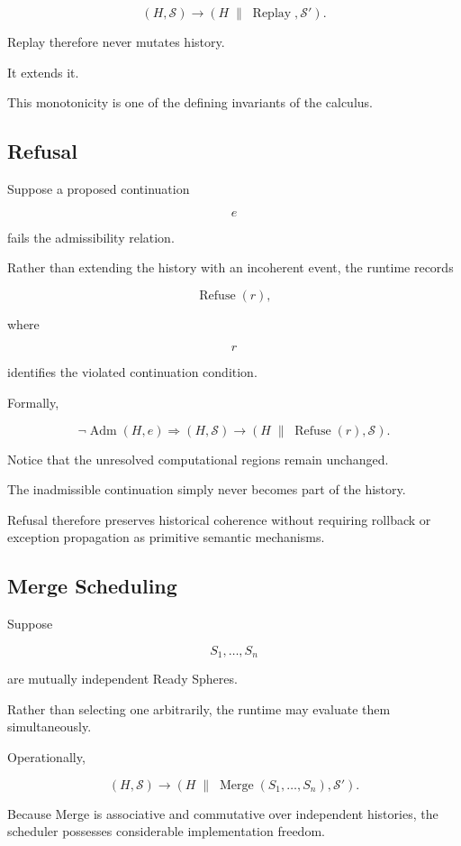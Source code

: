 \documentclass[12pt,oneside]{article}
\theoremstyle{definition}
\theoremstyle{remark}
\begin{document}
\[
(H,\mathcal{S})
\longrightarrow
(H\;\|\;\operatorname{Replay},
\mathcal{S}').
\]

Replay therefore never mutates history.

It extends it.

This monotonicity is one of the defining invariants of the calculus.

\subsection{Refusal}

Suppose a proposed continuation

\[
e
\]

fails the admissibility relation.

Rather than extending the history with an incoherent event, the runtime
records

\[
\operatorname{Refuse}(r),
\]

where

\[
r
\]

identifies the violated continuation condition.

Formally,

\[
\neg
\operatorname{Adm}(H,e)
\Longrightarrow
(H,\mathcal{S})
\longrightarrow
(H\;\|\;\operatorname{Refuse}(r),
\mathcal{S}).
\]

Notice that the unresolved computational regions remain unchanged.

The inadmissible continuation simply never becomes part of the history.

Refusal therefore preserves historical coherence without requiring rollback or
exception propagation as primitive semantic mechanisms.

\subsection{Merge Scheduling}

Suppose

\[
S_1,\ldots,S_n
\]

are mutually independent Ready Spheres.

Rather than selecting one arbitrarily, the runtime may evaluate them
simultaneously.

Operationally,

\[
(H,\mathcal{S})
\longrightarrow
(H\;\|\;
\operatorname{Merge}
(S_1,\ldots,S_n),
\mathcal{S}').
\]

Because Merge is associative and commutative over independent histories, the
scheduler possesses considerable implementation freedom.
\end{document}
